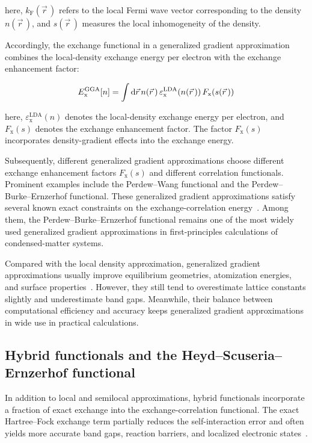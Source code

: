 here, $k_\mathrm{F}(\vec{r}\,)$ refers to the local Fermi wave vector corresponding to the density $n(\vec{r}\,)$,
and $s(\vec{r}\,)$ measures the local inhomogeneity of the density.

Accordingly, the exchange functional in a generalized gradient approximation combines the local-density exchange energy per electron with the exchange enhancement factor:

\begin{equation}
    E_\mathrm{x}^\mathrm{GGA}[n]
    = \int\mathrm{d}{\vec{r}}\,n(\vec{r}\,)\,\varepsilon_\mathrm{x}^\mathrm{LDA}(n(\vec{r}\,))\,F_\mathrm{x}(s(\vec{r}\,))
\label{GGA_exchange_functional_enhancement_factor_form}
\end{equation}

here, $\varepsilon_\mathrm{x}^\mathrm{LDA}(n)$ denotes the local-density exchange energy per electron,
and $F_\mathrm{x}(s)$ denotes the exchange enhancement factor.
The factor $F_\mathrm{x}(s)$ incorporates density-gradient effects into the exchange energy.

Subsequently, different generalized gradient approximations choose different exchange enhancement factors $F_\mathrm{x}(s)$ and different correlation functionals.
Prominent examples include the Perdew--Wang functional and the Perdew--Burke--Ernzerhof functional.
These generalized gradient approximations satisfy several known exact constraints on the exchange-correlation energy~\cite{perdew1992atoms, perdew1996generalized}.
Among them, the Perdew--Burke--Ernzerhof functional remains one of the most widely used generalized gradient approximations in first-principles calculations of condensed-matter systems.

Compared with the local density approximation,
generalized gradient approximations usually improve equilibrium geometries,
atomization energies, and surface properties~\cite{dasilva2006converged}.
However, they still tend to overestimate lattice constants slightly and underestimate band gaps.
Meanwhile, their balance between computational efficiency and accuracy keeps generalized gradient approximations in wide use in practical calculations.

\subsection[Hybrid functionals and Heyd--Scuseria--Ernzerhof functional]{Hybrid functionals and the Heyd--Scuseria--Ernzerhof functional}

In addition to local and semilocal approximations,
hybrid functionals incorporate a fraction of exact exchange into the exchange-correlation functional.
The exact Hartree--Fock exchange term partially reduces the self-interaction error and often yields more accurate band gaps, reaction barriers, and localized electronic states~\cite{carter2012vacancies}.

